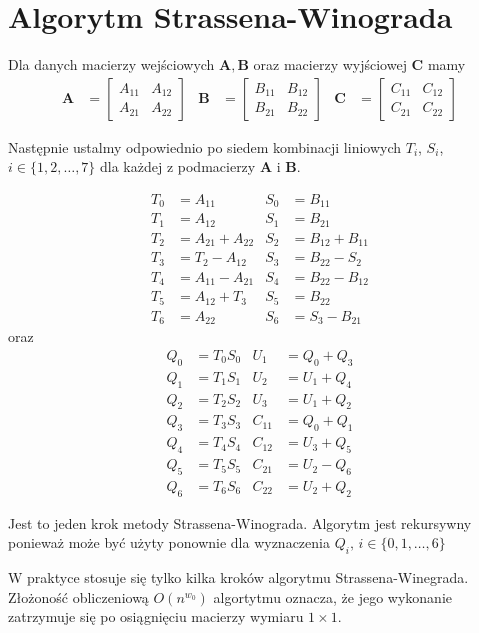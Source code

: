 \section{Algorytm Strassena-Winograda}
Dla danych macierzy wejściowych \(\mathbf{A}, \mathbf{B}\) oraz macierzy wyjściowej \(\mathbf{C}\) mamy
\begin{align*}
\mathbf{A}& = \begin{bmatrix} A_{11}& A_{12} \\ A_{21}& A_{22} \end{bmatrix}&
\mathbf{B}& = \begin{bmatrix} B_{11}& B_{12} \\ B_{21}& B_{22} \end{bmatrix}&
\mathbf{C}& = \begin{bmatrix} C_{11}& C_{12} \\ C_{21}& C_{22} \end{bmatrix}
\end{align*}

Następnie ustalmy odpowiednio po siedem kombinacji liniowych \(T_i\), \(S_i\), \(i\in \{1, 2, \dots,7\}\) dla każdej z podmacierzy \(\mathbf{A}\) i \(\mathbf{B}\).

\begin{align*}
T_0& = A_{11}& S_0 &= B_{11}\\
T_1& = A_{12}& S_1 &= B_{21}\\
T_2& = A_{21} + A_{22}& S_2 &= B_{12}+B_{11}\\
T_3& = T_2 - A_{12}& S_3 &= B_{22}-S_2\\
T_4& = A_{11}-A_{21}& S_4 &= B_{22}-B_{12}\\
T_5& = A_{12}+T_3& S_5 &= B_{22}\\
T_6& = A_{22}& S_6 &= S_3-B_{21}
\end{align*}
oraz
\begin{align*}
Q_0& = T_{0}S_{0}& U_1 &= Q_{0} + Q_{3}\\
Q_1& = T_{1}S_{1}& U_2 &= U_{1} + Q_{4}\\
Q_2& = T_{2}S_{2}& U_3 &= U_{1} + Q_{2}\\
Q_3& = T_{3}S_{3}& C_{11} &= Q_{0} + Q_{1}\\
Q_4& = T_{4}S_{4}& C_{12} &= U_{3} + Q_{5}\\
Q_5& = T_{5}S_{5}& C_{21} &= U_{2} - Q_{6}\\
Q_6& = T_{6}S_{6}& C_{22} &= U_{2} + Q_{2}
\end{align*}

Jest to jeden krok metody Strassena-Winograda. Algorytm jest rekursywny ponieważ może być użyty ponownie dla wyznaczenia \(Q_i,\,i\in\{0,1,\dots,6\}\)

W praktyce stosuje się tylko kilka kroków algorytmu Strassena-Winegrada\cite{DBLP:journals/corr/abs-1202-3173}. Złożoność obliczeniową \(O(n^{w_0})\) algortytmu oznacza, że jego wykonanie zatrzymuje się po osiągnięciu macierzy wymiaru \(1\times 1\).

